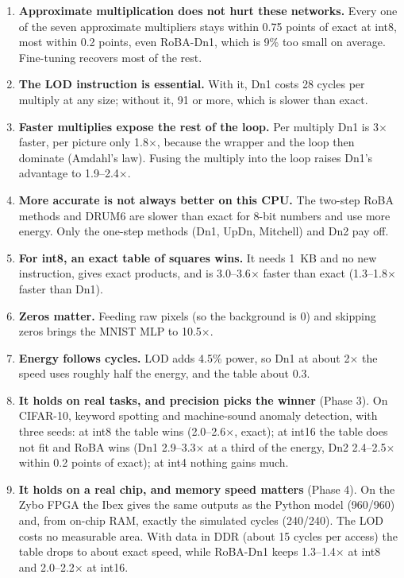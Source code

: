 \begin{enumerate}
  \item \textbf{Approximate multiplication does not hurt these networks.} Every one of the seven
        approximate multipliers stays within 0.75 points of exact at int8, most within 0.2 points, even
        RoBA-Dn1, which is 9\% too small on average. Fine-tuning recovers most of the rest.
  \item \textbf{The LOD instruction is essential.} With it, Dn1 costs 28 cycles per multiply at any size;
        without it, 91 or more, which is slower than exact.
  \item \textbf{Faster multiplies expose the rest of the loop.} Per multiply Dn1 is 3$\times$ faster, per
        picture only 1.8$\times$, because the wrapper and the loop then dominate (Amdahl's law). Fusing the
        multiply into the loop raises Dn1's advantage to 1.9--2.4$\times$.
  \item \textbf{More accurate is not always better on this CPU.} The two-step RoBA methods and DRUM6 are
        slower than exact for 8-bit numbers and use more energy. Only the one-step methods (Dn1, UpDn,
        Mitchell) and Dn2 pay off.
  \item \textbf{For int8, an exact table of squares wins.} It needs 1~KB and no new instruction, gives exact
        products, and is 3.0--3.6$\times$ faster than exact (1.3--1.8$\times$ faster than Dn1).
  \item \textbf{Zeros matter.} Feeding raw pixels (so the background is 0) and skipping zeros brings the MNIST
        MLP to 10.5$\times$.
  \item \textbf{Energy follows cycles.} LOD adds 4.5\% power, so Dn1 at about 2$\times$ the speed uses roughly
        half the energy, and the table about 0.3.
  \item \textbf{It holds on real tasks, and precision picks the winner} (Phase 3). On CIFAR-10, keyword spotting
        and machine-sound anomaly detection, with three seeds: at int8 the table wins (2.0--2.6$\times$, exact);
        at int16 the table does not fit and RoBA wins (Dn1 2.9--3.3$\times$ at a third of the energy, Dn2
        2.4--2.5$\times$ within 0.2 points of exact); at int4 nothing gains much.
  \item \textbf{It holds on a real chip, and memory speed matters} (Phase 4). On the Zybo FPGA the Ibex gives the
        same outputs as the Python model (960/960) and, from on-chip RAM, exactly the simulated cycles (240/240).
        The LOD costs no measurable area. With data in DDR (about 15 cycles per access) the table drops to about
        exact speed, while RoBA-Dn1 keeps 1.3--1.4$\times$ at int8 and 2.0--2.2$\times$ at int16.
\end{enumerate}

